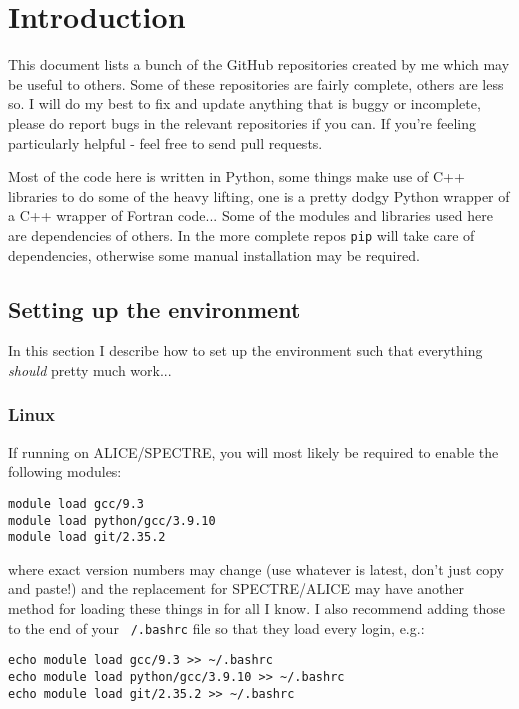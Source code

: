 \chapter{Introduction}

	This document lists a bunch of the GitHub repositories created by me which may be useful to others. Some of these repositories are fairly complete, others are less so. I will do my best to fix and update anything that is buggy or incomplete, please do report bugs in the relevant repositories if you can. If you're feeling particularly helpful - feel free to send pull requests. 
	
	Most of the code here is written in Python, some things make use of C++ libraries to do some of the heavy lifting, one is a pretty dodgy Python wrapper of a C++ wrapper of Fortran code... Some of the modules and libraries used here are dependencies of others. In the more complete repos \texttt{pip} will take care of dependencies, otherwise some manual installation may be required.

	\section{Setting up the environment}
		\label{sectSetup}

		In this section I describe how to set up the environment such that everything \textit{should} pretty much work...

		\subsection{Linux}
			
			If running on ALICE/SPECTRE, you will most likely be required to enable the following modules:

			\begin{verbatim}
module load gcc/9.3
module load python/gcc/3.9.10
module load git/2.35.2
			\end{verbatim}
			where exact version numbers may change (use whatever is latest, don't just copy and paste!) and the replacement for SPECTRE/ALICE may have another method for loading these things in for all I know. I also recommend adding those to the end of your \texttt{~/.bashrc} file so that they load every login, e.g.:
			\begin{verbatim}
echo module load gcc/9.3 >> ~/.bashrc
echo module load python/gcc/3.9.10 >> ~/.bashrc
echo module load git/2.35.2 >> ~/.bashrc
			\end{verbatim}
			
